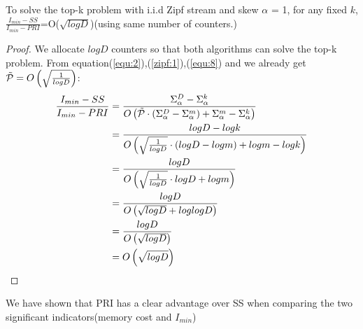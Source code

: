 \begin{theorem}
	To solve the top-k problem with i.i.d Zipf stream and skew $\alpha$ = 1, for any fixed $k$, $\frac{I_{min}-SS}{I_{min}-PRI}$=O($\sqrt{logD}$)(using same number of counters.) 
\end{theorem}


\begin{proof}
We allocate $logD$ counters so that both algorithms can solve the top-k problem.
From equation(\ref{equ:2}),(\ref{zipf:1}),(\ref{equ:8}) and we already get $\Tilde{\mathcal{P}}=O\left(\sqrt{\frac{1}{logD}}\right)$:
\begin{equation}
\begin{aligned}
\centering  
\frac{I_{min}-SS}{I_{min}-PRI} &=\frac{\Sigma_\alpha^D-\Sigma_\alpha^k}{O\left(\Tilde{\mathcal{P}}\cdot\left(\Sigma_\alpha^D-\Sigma_\alpha^m\right)+\Sigma_\alpha^m-\Sigma_\alpha^k\right)}\\
&=\frac{logD-logk}{O\left(\sqrt{\frac{1}{logD}}\cdot\left(logD-logm\right)+logm-logk\right)}\\
&=\frac{logD}{O\left(\sqrt{\frac{1}{logD}}\cdot logD + logm\right)}\\
&=\frac{logD}{O\left(\sqrt{logD}+loglogD\right)}\\
&=\frac{logD}{O\left(\sqrt{logD}\right)}\\
&=O\left(\sqrt{logD}\right)
\end{aligned}
\end{equation}

\end{proof}
We have shown that PRI has a clear advantage over SS when comparing the two significant indicators(memory cost and $I_{min}$)